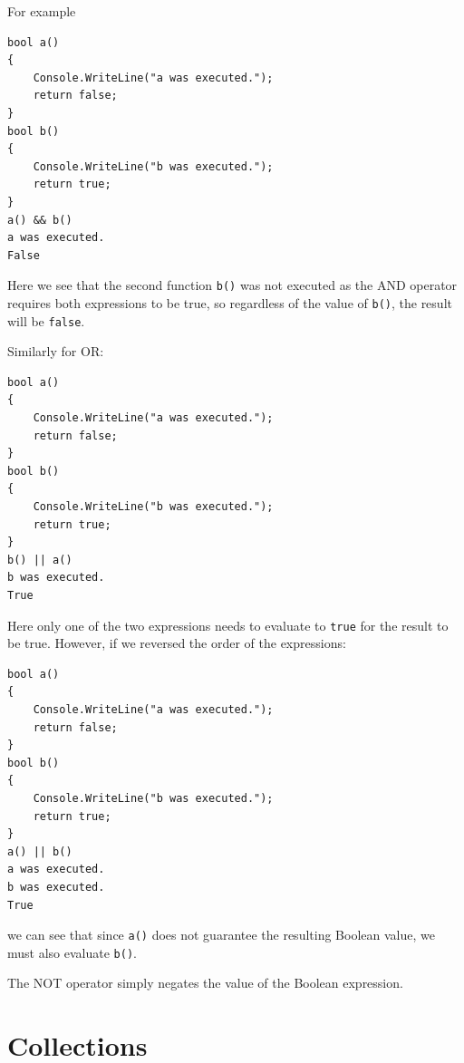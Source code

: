 \documentclass{article}
\def\customlinemarker#1#2{
    \edef\thelstnumber{%
        \unexpanded{%
            \ifnum#1=\value{lstnumber}\relax
              #2%
            \fi}%
        \ifx\thelstnumber\relax\else
        \expandafter\unexpanded\expandafter{\thelstnumber}%
        \fi
    }
}
\begin{document}
For example
\begingroup
\let\thelstnumber\relax
\customlinemarker{1}{\$}
\customlinemarker{2}{.}
\customlinemarker{3}{.}
\customlinemarker{4}{.}
\customlinemarker{5}{.}
\customlinemarker{6}{\$}
\customlinemarker{7}{.}
\customlinemarker{8}{.}
\customlinemarker{9}{.}
\customlinemarker{10}{.}
\customlinemarker{11}{\$}
\begin{lstlisting}
bool a() 
{ 
    Console.WriteLine("a was executed."); 
    return false;
}
bool b() 
{ 
    Console.WriteLine("b was executed."); 
    return true;
}
a() && b()
a was executed.
False
\end{lstlisting}
\endgroup
Here we see that the second function \lstinline{b()} was not executed
as the {\ttfamily AND} operator requires both expressions to be true,
so regardless of the value of \lstinline{b()}, the result will be
\lstinline{false}.

Similarly for {\ttfamily OR}:
\begingroup
\let\thelstnumber\relax
\customlinemarker{1}{\$}
\customlinemarker{2}{.}
\customlinemarker{3}{.}
\customlinemarker{4}{.}
\customlinemarker{5}{.}
\customlinemarker{6}{\$}
\customlinemarker{7}{.}
\customlinemarker{8}{.}
\customlinemarker{9}{.}
\customlinemarker{10}{.}
\customlinemarker{11}{\$}
\begin{lstlisting}
bool a() 
{ 
    Console.WriteLine("a was executed."); 
    return false;
}
bool b() 
{ 
    Console.WriteLine("b was executed."); 
    return true;
}
b() || a()
b was executed.
True
\end{lstlisting}
\endgroup
Here only one of the two expressions needs to evaluate to \lstinline{true}
for the result to be true. However, if we reversed the order of
the expressions:
\begingroup
\let\thelstnumber\relax
\customlinemarker{1}{\$}
\customlinemarker{2}{.}
\customlinemarker{3}{.}
\customlinemarker{4}{.}
\customlinemarker{5}{.}
\customlinemarker{6}{\$}
\customlinemarker{7}{.}
\customlinemarker{8}{.}
\customlinemarker{9}{.}
\customlinemarker{10}{.}
\customlinemarker{11}{\$}
\begin{lstlisting}
bool a() 
{ 
    Console.WriteLine("a was executed."); 
    return false;
}
bool b() 
{ 
    Console.WriteLine("b was executed."); 
    return true;
}
a() || b()
a was executed.
b was executed.
True
\end{lstlisting}
\endgroup
we can see that since \lstinline{a()} does not guarantee
the resulting Boolean value, we must also evaluate \lstinline{b()}.

The {\ttfamily NOT} operator simply negates the value of the Boolean expression.
\section{Collections}
\end{document}
